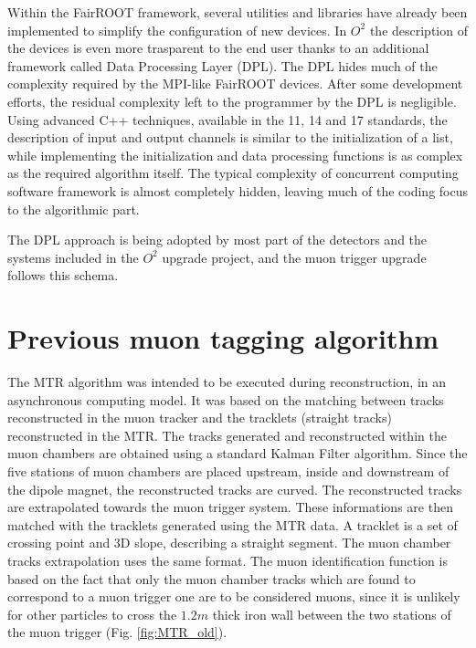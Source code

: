 Within the FairROOT framework, several utilities and libraries have already been implemented to simplify the configuration of new devices.
In $O^2$ the description of the devices is even more trasparent to the end user thanks to an additional framework called Data Processing Layer (DPL).
The DPL hides much of the complexity required by the MPI-like FairROOT devices.
After some development efforts, the residual complexity left to the programmer by the DPL is negligible.
Using advanced C++ techniques, available in the 11, 14 and 17 standards, the description of input and output channels is similar to the initialization of a list, while implementing the initialization and data processing functions is as complex as the required algorithm itself.
The typical complexity of concurrent computing software framework is almost completely hidden, leaving much of the coding focus to the algorithmic part.

The DPL approach is being adopted by most part of the detectors and the systems included in the $O^2$ upgrade project, and the muon trigger upgrade follows this schema.

\section{Previous muon tagging algorithm}
The MTR algorithm was intended to be executed during reconstruction, in an asynchronous computing model.
It was based on the matching between tracks reconstructed in the muon tracker and the tracklets (straight tracks) reconstructed in the MTR.
The tracks generated and reconstructed within the muon chambers are obtained using a standard Kalman Filter algorithm.
Since the five stations of muon chambers are placed upstream, inside and downstream of the dipole magnet, the reconstructed tracks are curved.
The reconstructed tracks are extrapolated towards the muon trigger system.
These informations are then matched with the tracklets generated using the MTR data.
A tracklet is a set of crossing point and 3D slope, describing a straight segment.
The muon chamber tracks extrapolation uses the same format.
The muon identification function is based on the fact that only the muon chamber tracks which are found to correspond to a muon trigger one are to be considered muons, since it is unlikely for other particles to cross the $1.2m$ thick iron wall between the two stations of the muon trigger (Fig. \ref{fig:MTR_old}).

